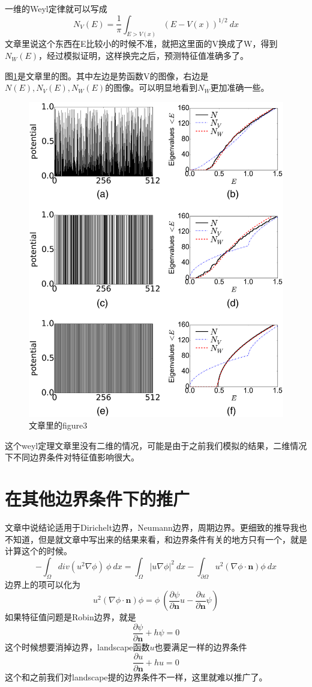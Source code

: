 \documentclass[UTF8,12pt]{article}
\begin{document}
一维的Weyl定律就可以写成
$$ N_V(E) = \frac{1}{\pi} \int_{E > V(x)} (E - V(x))^{1/2}  \ dx $$
文章里说这个东西在E比较小的时候不准，就把这里面的V换成了W，得到$N_W(E)$，经过模拟证明，这样换完之后，预测特征值准确多了。

图\ref{article3}是文章里的图。其中左边是势函数V的图像，右边是$N(E),N_V(E),N_W(E)$的图像。可以明显地看到$N_W$更加准确一些。

\begin{figure}[htbp]
\centering
\includegraphics[width=0.7\linewidth]{article3}
\caption{文章里的figure3}
\label{article3}
\end{figure}

这个weyl定理文章里没有二维的情况，可能是由于之前我们模拟的结果，二维情况下不同边界条件对特征值影响很大。

\newpage

\section{在其他边界条件下的推广}

文章中说结论适用于Dirichelt边界，Neumann边界，周期边界。更细致的推导我也不知道，但是就文章中写出来的结果来看，和边界条件有关的地方只有一个，就是计算这个的时候。
$$ - \int_\Omega div(u^2 \nabla \phi) \ \phi \ dx = \int_\Omega |u \nabla \phi|^2 \ dx - \int_{\partial \Omega} u^2 (\nabla \phi \cdot \mathbf{n}) \phi \ dx $$
边界上的项可以化为
$$ u^2 (\nabla \phi \cdot \mathbf{n}) \phi = \phi \ (\frac{\partial \psi}{\partial \mathbf{n}} u - \frac{\partial u}{\partial \mathbf{n}} \psi) $$
如果特征值问题是Robin边界，就是
$$ \frac{\partial \psi}{\partial \mathbf{n}} + h \psi = 0 $$
这个时候想要消掉边界，landscape函数$u$也要满足一样的边界条件
$$ \frac{\partial u}{\partial \mathbf{n}} + h u = 0 $$
这个和之前我们对landscape提的边界条件不一样，这里就难以推广了。
\end{document}
